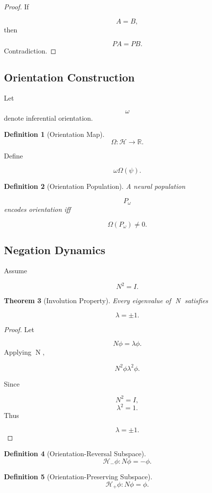 \documentclass[12pt]{article}
\newtheorem{theorem}{Theorem}[section]
\newtheorem{definition}[theorem]{Definition}
\theoremstyle{remark}
\begin{document}
\begin{proof}
If

\[
A=B,
\]
then

\[
PA=PB.
\]
Contradiction.
\end{proof}

\subsection{Orientation Construction}

Let

\[
\omega
\]
denote inferential orientation.

\begin{definition}[Orientation Map]
\[
\Omega:\mathcal H\rightarrow\mathbb R.
\]
\end{definition}
Define

\[
\omega
\Omega(\psi).
\]

\begin{definition}[Orientation Population]
A neural population

\[
P_\omega
\]
encodes orientation iff

\[
\Omega(P_\omega)\neq0.
\]
\end{definition}
\subsection{Negation Dynamics}

Assume

\[
N^2=I.
\]
\begin{theorem}[Involution Property]
Every eigenvalue of N satisfies

\[
\lambda=\pm1.
\]
\end{theorem}
\begin{proof}
Let

\[
N\phi=\lambda\phi.
\]
Applying N,

\[
N^2\phi
\lambda^2\phi.
\]

Since

\[
N^2=I,
\]
\[
\lambda^2=1.
\]
Thus

\[
\lambda=\pm1.
\]
\end{proof}
\begin{definition}[Orientation-Reversal Subspace]
\[
\mathcal H_-
{
\phi:
N\phi=-\phi
}.
\]
\end{definition}

\begin{definition}[Orientation-Preserving Subspace]
\[
\mathcal H_+
{
\phi:
N\phi=\phi
}.
\]
\end{definition}
\end{document}
